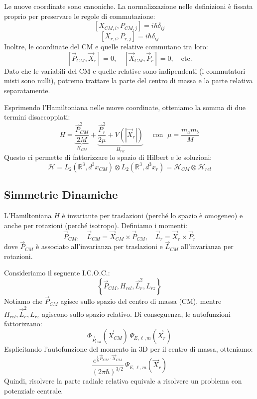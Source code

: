 Le nuove coordinate sono canoniche. La normalizzazione nelle definizioni è fissata proprio per preservare le regole di commutazione:
\[
[X_{CM, i}, P_{CM, j}] = i\hbar \delta_{ij}
\]
\[
[X_{r, i}, P_{r, j}] = i\hbar \delta_{ij}
\]
Inoltre, le coordinate del CM e quelle relative commutano tra loro:
\[
[\vec{P}_{CM}, \vec{X}_r] = 0, \quad [\vec{X}_{CM}, \vec{P}_r] = 0, \quad \text{etc.}
\]
Dato che le variabili del CM e quelle relative sono indipendenti (i commutatori misti sono nulli), potremo trattare la parte del centro di massa e la parte relativa separatamente.


Esprimendo l'Hamiltoniana nelle nuove coordinate, otteniamo la somma di due termini disaccoppiati:
\begin{equation}
    H = \underbrace{\frac{\vec{P}_{CM}^2}{2M}}_{H_{CM}} + \underbrace{\frac{\vec{P}_r^2}{2\mu} + V(|\vec{X}_r|)}_{H_{rel}} \quad \text{ con } \; \mu = \frac{m_a m_b}{M}
\end{equation}
Questo ci permette di fattorizzare lo spazio di Hilbert e le soluzioni:
\begin{equation}
    \mathcal{H} = L_2(\mathbb{R}^3, d^3x_{CM}) \otimes L_2(\mathbb{R}^3, d^3x_r) = \mathcal{H}_{CM} \otimes \mathcal{H}_{rel}
\end{equation}

\subsection{Simmetrie Dinamiche}

L'Hamiltoniana \( H \) è invariante per traslazioni (perché lo spazio è omogeneo) e anche per rotazioni (perché isotropo).
Definiamo i momenti:
\[
\vec{P}_{CM}, \quad \vec{L}_{CM} = \vec{X}_{CM} \times \vec{P}_{CM}, \quad \vec{L}_r = \vec{X}_r \times \vec{P}_r
\]
dove \( \vec{P}_{CM} \) è associato all'invarianza per traslazioni e \( \vec{L}_{CM} \) all'invarianza per rotazioni.

Consideriamo il seguente I.C.O.C.:
\[
\left\{ \vec{P}_{CM}, H_{rel}, \vec{L}_r^2, L_{rz} \right\}
\]
Notiamo che \( \vec{P}_{CM} \) agisce sullo spazio del centro di massa (CM), mentre \( H_{rel}, \vec{L}_r^2, L_{rz} \) agiscono sullo spazio relativo.
Di conseguenza, le autofunzioni fattorizzano:
\begin{equation}
    \Phi_{\vec{P}_{CM}}(\vec{X}_{CM}) \, \Psi_{E,\ell,m}(\vec{X}_r)
\end{equation}
Esplicitando l'autofunzione del momento in 3D per il centro di massa, otteniamo:
\[
\frac{e^{\frac{i}{\hbar}\vec{P}_{CM}\cdot \vec{X}_{CM}}}{(2\pi\hbar)^{3/2}} \, {\Psi_{E,\ell,m}(\vec{X}_r)}
\]
Quindi, risolvere la parte radiale relativa equivale a risolvere un problema con potenziale centrale.

